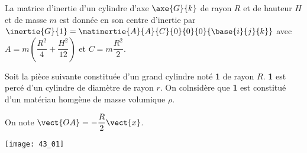 \normaltrue \difficilefalse \tdifficilefalse
\correctionfalse


\setcounter{question}{0}%
\ifcorrection
\else
{}
\fi

\ifprof
\else
La matrice d'inertie d'un cylindre d'axe $\axe{G}{k}$ de rayon $R$ et de hauteur $H$ et de masse $m$ est donnée en son centre d'inertie par 
$\inertie{G}{1}=\matinertie{A}{A}{C}{0}{0}{0}{\base{i}{j}{k}}$ avec $A=m\left(\dfrac{R^2}{4}+\dfrac{H^2}{12} \right)$ et $C=m\dfrac{R^2}{2}$. 

Soit la pièce suivante constituée d'un grand cylindre noté \textbf{1} de rayon $R$.  \textbf{1} est percé d'un cylindre de diamètre de rayon $r$. On colnsidère que \textbf{1} est constitué d'un matériau homgène de masse volumique $\rho$. 

On note $\vect{OA}=-\dfrac{R}{2}\vect{x}$. 
\begin{marginfigure}
\centering
\texttt{[image: 43\_01]}
\end{marginfigure}
\fi


\ifprof
\else
\fi

\ifprof ~\\
\else
\fi


\ifprof
\else
{}
\fi